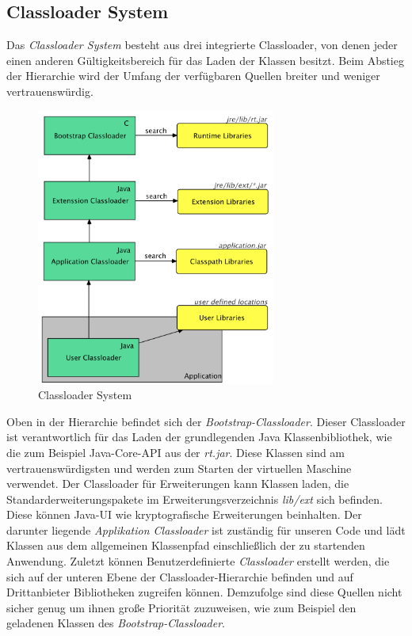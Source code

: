   \subsection{Classloader System} \label{sec:cls}
    Das \textit{Classloader System} besteht aus drei integrierte Classloader, von denen jeder einen anderen Gültigkeitsbereich für das Laden der Klassen besitzt. Beim Abstieg der Hierarchie wird der Umfang der verfügbaren Quellen breiter und weniger vertrauenswürdig. 
    \begin{figure}[h!]
      \centering
      \includegraphics[width=0.7\textwidth]{material/images/Classloader.png}
      \caption{Classloader System}
      \label{fig:Classloader}
    \end{figure}
    
    Oben in der Hierarchie befindet sich der \textit{Bootstrap-Classloader}. Dieser Classloader ist verantwortlich für das Laden der grundlegenden Java Klassenbibliothek, wie die zum Beispiel Java-Core-API aus der \textit{rt.jar}. Diese Klassen sind am vertrauenswürdigsten und werden zum Starten der virtuellen Maschine verwendet. Der Classloader für Erweiterungen kann Klassen laden, die Standarderweiterungspakete im Erweiterungsverzeichnis \textit{lib/ext} sich befinden. Diese können Java-UI wie kryptografische Erweiterungen beinhalten. Der darunter liegende \textit{Applikation Classloader} ist zuständig für unseren Code und lädt Klassen aus dem allgemeinen Klassenpfad einschließlich der zu startenden Anwendung. Zuletzt können Benutzerdefinierte \textit{Classloader} erstellt werden, die sich auf der unteren Ebene der Classloader-Hierarchie befinden und auf Drittanbieter Bibliotheken zugreifen können. Demzufolge sind diese Quellen nicht sicher genug um ihnen große Priorität zuzuweisen, wie zum Beispiel den geladenen Klassen des \textit{Bootstrap-Classloader}. \bigbreak 

